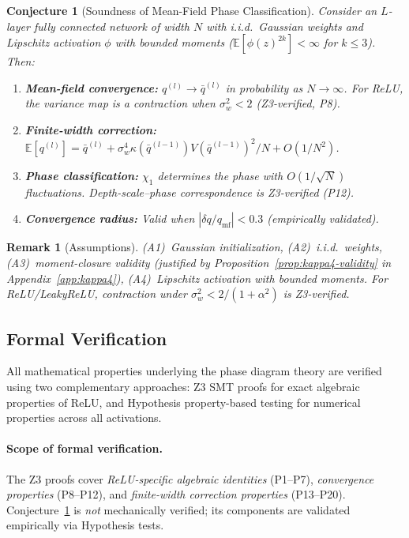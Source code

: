 \documentclass[10pt]{article}
\newcommand{\EE}{\mathbb{E}}
\newtheorem{conjecture}[theorem]{Conjecture}
\newtheorem{remark}[theorem]{Remark}
\begin{document}
\begin{conjecture}[Soundness of Mean-Field Phase Classification]
\label{thm:soundness}
Consider an $L$-layer fully connected network of width $N$ with i.i.d.\ Gaussian weights and Lipschitz activation $\phi$ with bounded moments ($\EE[\phi(z)^{2k}] < \infty$ for $k \leq 3$). Then:
\begin{enumerate}[nosep]
    \item \textbf{Mean-field convergence:} $q^{(l)} \to \bar{q}^{(l)}$ in probability as $N \to \infty$. For ReLU, the variance map is a contraction when $\sigma_w^2 < 2$ (Z3-verified, P8).
    \item \textbf{Finite-width correction:} $\EE[q^{(l)}] = \bar{q}^{(l)} + \sigma_w^4 \kappa(\bar{q}^{(l-1)}) V(\bar{q}^{(l-1)})^2 / N + O(1/N^2)$.
    \item \textbf{Phase classification:} $\chi_1$ determines the phase with $O(1/\sqrt{N})$ fluctuations. Depth-scale--phase correspondence is Z3-verified (P12).
    \item \textbf{Convergence radius:} Valid when $|\delta q / q_{\mathrm{mf}}| < 0.3$ (empirically validated).
\end{enumerate}
\end{conjecture}

\begin{remark}[Assumptions]
(A1)~Gaussian initialization, (A2)~i.i.d.\ weights, (A3)~moment-closure validity (justified by Proposition~\ref{prop:kappa4-validity} in Appendix~\ref{app:kappa4}), (A4)~Lipschitz activation with bounded moments.
For ReLU/LeakyReLU, contraction under $\sigma_w^2 < 2/(1+\alpha^2)$ is Z3-verified.
\end{remark}

\subsection{Formal Verification}
\label{sec:verification}

All mathematical properties underlying the phase diagram theory are verified using two complementary approaches: Z3 SMT proofs for exact algebraic properties of ReLU, and Hypothesis property-based testing for numerical properties across all activations.

\paragraph{Scope of formal verification.}
The Z3 proofs cover \emph{ReLU-specific algebraic identities} (P1--P7), \emph{convergence properties} (P8--P12), and \emph{finite-width correction properties} (P13--P20).
Conjecture~\ref{thm:soundness} is \emph{not} mechanically verified; its components are validated empirically via Hypothesis tests.
\end{document}
